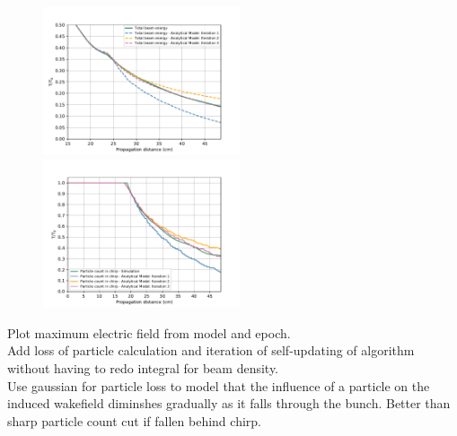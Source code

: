 \begin{figure}
\centering
\includegraphics[width=0.52\textwidth]{IterationsEnergy.pdf}\hspace{-25pt}
\includegraphics[width=0.52\textwidth]{Particlesinbeamconstant1to102.pdf}
\end{figure}






\newpage
Plot maximum electric field from model and epoch.\\
Add loss of particle calculation and iteration of self-updating of algorithm without having to redo integral for beam density.\\
Use gaussian for particle loss to model that the influence of a particle on the induced wakefield diminshes gradually as it falls through the bunch. Better than sharp particle count cut if fallen behind chirp.




